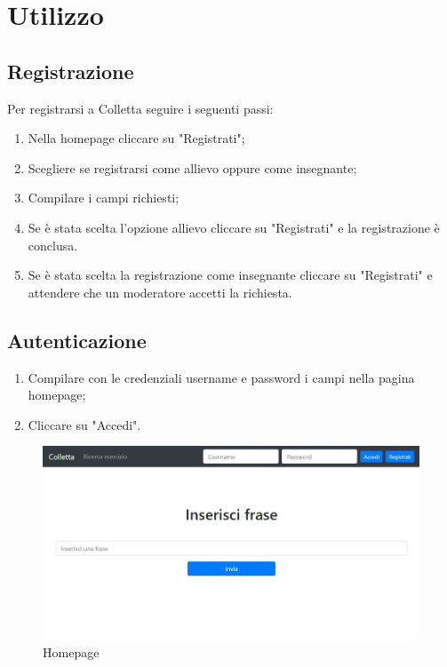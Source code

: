 \documentclass[11pt,a4paper]{article}
\begin{document}
{ \newpage
	\section{Utilizzo}	
	
	\subsection{Registrazione}
	Per registrarsi a Colletta seguire i seguenti passi:
	\begin{enumerate}
	\item Nella homepage cliccare su "Registrati";
	\item Scegliere se registrarsi come allievo oppure come insegnante;
	\item Compilare i campi richiesti;
	\item Se è stata scelta l'opzione allievo cliccare su "Registrati" e la registrazione è conclusa.
	\item Se è stata scelta la registrazione come insegnante cliccare su "Registrati" e attendere che un moderatore accetti la richiesta.
	\end{enumerate}

	\subsection{Autenticazione}
	\begin{enumerate}
		\item Compilare con le credenziali username e password i campi nella pagina homepage;
		\item Cliccare su "Accedi".
	\end{enumerate}

	\begin{figure}[h]
		\centering
		\includegraphics[scale=0.65]{images/home.jpg}
		\caption{Homepage}
	\end{figure}

}
\end{document}
